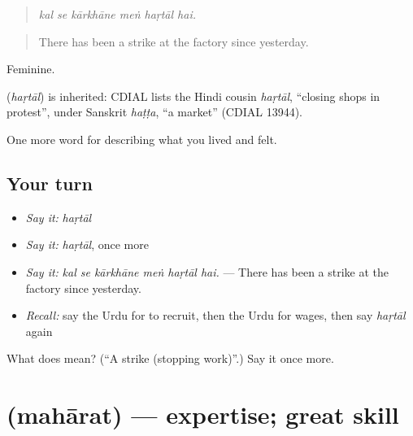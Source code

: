 \begin{quote}
     
\end{quote}

\begin{quote}
\emph{kal se kārkhāne meṅ haṛtāl hai.}
\end{quote}

\begin{quote}
There has been a strike at the factory since yesterday.
\end{quote}

Feminine.

\begin{cousinweb}
\textbf{} (\emph{haṛtāl}) is inherited: CDIAL lists the Hindi cousin \emph{haṛtāl}, \textquotedblleft{}closing shops in protest\textquotedblright{}, under Sanskrit \emph{haṭṭa}, \textquotedblleft{}a market\textquotedblright{} (CDIAL 13944).
\end{cousinweb}

\begin{grammarlens}[title={What you've built}]
One more word for describing what you lived and felt.
\end{grammarlens}

\subsection*{Your turn}
\begin{itemize}
\raggedright
  \item \emph{Say it:} \emph{haṛtāl}
  \item \emph{Say it:} \emph{haṛtāl}, once more
  \item \emph{Say it:} \emph{kal se kārkhāne meṅ haṛtāl hai.} — There has been a strike at the factory since yesterday.
  \item \emph{Recall:} say the Urdu for to recruit, then the Urdu for wages, then say \emph{haṛtāl} again
\end{itemize}

\begin{tcolorbox}[breakable,colback=teal!4,colframe=teal!35!black,title={Before you move on}]
What does  mean? (\textquotedblleft{}A strike (stopping work)\textquotedblright{}.) Say it once more.
\end{tcolorbox}
\section[\texorpdfstring{\ur{مہارت} (mahārat)}{مہارت (mahārat)}]{ (mahārat) — expertise; great skill}

